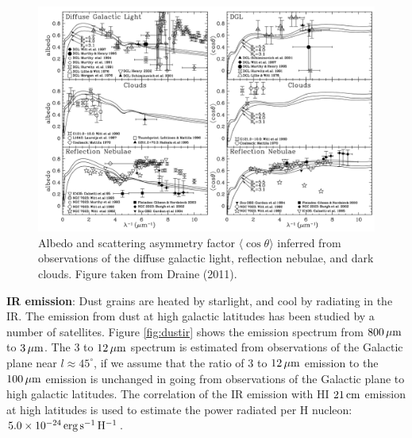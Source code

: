 \documentclass[a4paper,10pt]{article}
\begin{document}
\begin{figure}[t]
    \centering
    \includegraphics[width=16cm]{figures/albedo.png}
    \caption{\footnotesize{Albedo and scattering asymmetry factor $\langle\cos\theta\rangle$ inferred from observations of the diffuse galactic light, reflection nebulae, and dark clouds. Figure taken from Draine (2011).}}
    \label{fig:albedo}
\end{figure}

{\noindent}\textbf{IR emission}: Dust grains are heated by starlight, and cool by radiating in the IR. The emission from dust at high galactic latitudes has been studied by a number of satellites. Figure \ref{fig:dustir} shows the emission spectrum from $800\,\mu{\rm m}$ to $3\,\mu{\rm m}$. The $3$ to $12\,\mu{\rm m}$ spectrum is estimated from observations of the Galactic plane near $l\approx45^\circ$, if we assume that the ratio of $3$ to $12\,\mu{\rm m}$ emission to the $100\,\mu{\rm m}$ emission is unchanged in going from observations of the Galactic plane to high galactic latitudes. The correlation of the IR emission with HI $21\,{\rm cm}$ emission at high latitudes is used to estimate the power radiated per H nucleon: $5.0\times10^{-24}\,{\rm erg\,s^{-1}\,H^{-1}}$.
\end{document}
